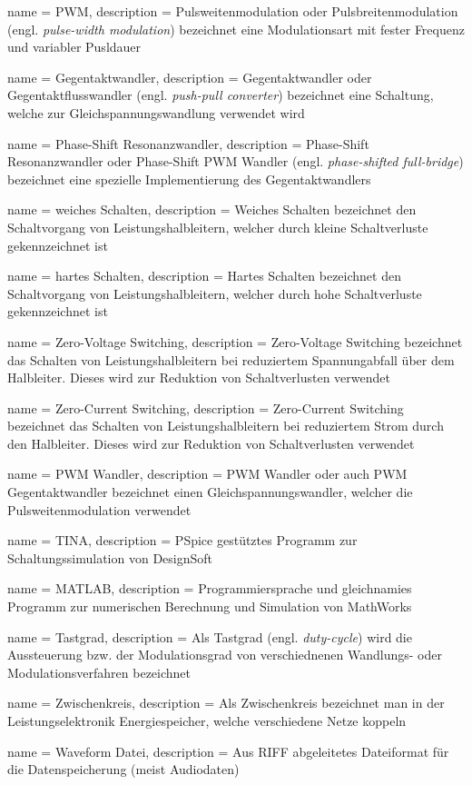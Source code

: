  {
	name		= {PWM},
	description	= {Pulsweitenmodulation oder Pulsbreitenmodulation
		(engl. \emph{pulse-width modulation}) bezeichnet eine
		Modulationsart mit fester Frequenz und variabler
		Pusldauer}
}

 {
	name		= {Gegentaktwandler},
	description	= {Gegentaktwandler oder Gegentaktflusswandler
		(engl. \emph{push-pull converter}) bezeichnet eine
		Schaltung, welche zur Gleichspannungswandlung verwendet wird}
}

 {
	name		= {Phase-Shift Resonanzwandler},
	description	= {Phase-Shift Resonanzwandler oder Phase-Shift
		PWM Wandler (engl. \emph{phase-shifted full-bridge})
		bezeichnet eine spezielle Implementierung des
		Gegentaktwandlers}
}

 {
	name		= {weiches Schalten},
	description	= {Weiches Schalten bezeichnet den Schaltvorgang
		von Leistungshalbleitern, welcher durch kleine Schaltverluste
		gekennzeichnet ist}
}

 {
	name		= {hartes Schalten},
	description	= {Hartes Schalten bezeichnet den Schaltvorgang
		von Leistungshalbleitern, welcher durch hohe Schaltverluste
		gekennzeichnet ist}
}

 {
	name		= {Zero-Voltage Switching},
	description	= {Zero-Voltage Switching bezeichnet das
		Schalten von Leistungshalbleitern bei reduziertem
		Spannungabfall über dem Halbleiter. Dieses wird zur
		Reduktion von Schaltverlusten verwendet}
}

 {
	name		= {Zero-Current Switching},
	description	= {Zero-Current Switching bezeichnet das
		Schalten von Leistungshalbleitern bei reduziertem
		Strom durch den Halbleiter. Dieses wird zur
		Reduktion von Schaltverlusten verwendet}
}

 {
	name		= {PWM Wandler},
	description	= {PWM Wandler oder auch PWM Gegentaktwandler
		bezeichnet einen Gleichspannungswandler, welcher die
		Pulsweitenmodulation verwendet}
}

 {
	name		= {TINA},
	description	= {PSpice gestütztes Programm zur
		Schaltungssimulation von DesignSoft}
}

 {
	name		= {MATLAB},
	description	= {Programmiersprache und gleichnamies Programm
		zur numerischen Berechnung und Simulation von
		MathWorks}
}

 {
	name		= {Tastgrad},
	description	= {Als Tastgrad (engl. \emph{duty-cycle}) wird die
		Aussteuerung bzw. der Modulationsgrad von
		verschiednenen Wandlungs- oder Modulationsverfahren
		bezeichnet}
}

 {
	name		= {Zwischenkreis},
	description	= {Als Zwischenkreis bezeichnet man in der
		Leistungselektronik Energiespeicher, welche verschiedene
		Netze koppeln}
}

 {
	name		= {Waveform Datei},
	description	= {Aus RIFF abgeleitetes Dateiformat für die
		Datenspeicherung (meist Audiodaten)}
}
